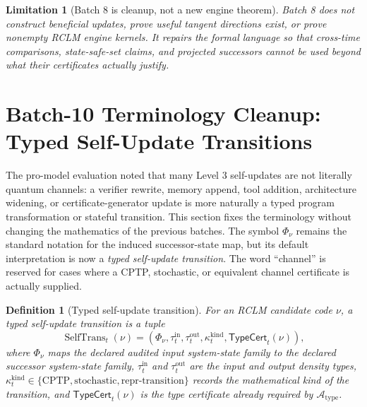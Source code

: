 \documentclass[11pt,a4paper]{article}
\newtheorem{definition}[theorem]{Definition}
\newtheorem{limitation}[theorem]{Limitation}
\newcommand{\Acal}{\mathcal A}
\newcommand{\SelfTrans}{\operatorname{SelfTrans}}
\begin{document}
\begin{limitation}[Batch 8 is cleanup, not a new engine theorem]
Batch 8 does not construct beneficial updates, prove useful tangent directions exist, or prove nonempty RCLM engine kernels.  It repairs the formal language so that cross-time comparisons, state-safe-set claims, and projected successors cannot be used beyond what their certificates actually justify.
\end{limitation}


\section{Batch-10 Terminology Cleanup: Typed Self-Update Transitions}
\label{sec:batch10-typed-transition-terminology}

The pro-model evaluation noted that many Level 3 self-updates are not literally quantum channels: a verifier rewrite, memory append, tool addition, architecture widening, or certificate-generator update is more naturally a typed program transformation or stateful transition.  This section fixes the terminology without changing the mathematics of the previous batches.  The symbol \(\Phi_\nu\) remains the standard notation for the induced successor-state map, but its default interpretation is now a \emph{typed self-update transition}.  The word ``channel'' is reserved for cases where a CPTP, stochastic, or equivalent channel certificate is actually supplied.

\begin{definition}[Typed self-update transition]
\label{def:typed-self-update-transition}
For an RCLM candidate code \(\nu\), a typed self-update transition is a tuple
\[
\SelfTrans_t(\nu)=
(\Phi_\nu,\tau_t^{\mathrm{in}},\tau_t^{\mathrm{out}},\kappa_t^{\mathrm{kind}},\mathsf{TypeCert}_t(\nu)),
\]
where \(\Phi_\nu\) maps the declared audited input system-state family to the declared successor system-state family, \(\tau_t^{\mathrm{in}}\) and \(\tau_t^{\mathrm{out}}\) are the input and output density types, \(\kappa_t^{\mathrm{kind}}\in\{\mathrm{CPTP},\mathrm{stochastic},\mathrm{repr\mbox{-}transition}\}\) records the mathematical kind of the transition, and \(\mathsf{TypeCert}_t(\nu)\) is the type certificate already required by \(\Acal_{\mathrm{type}}\).
\end{definition}
\end{document}
